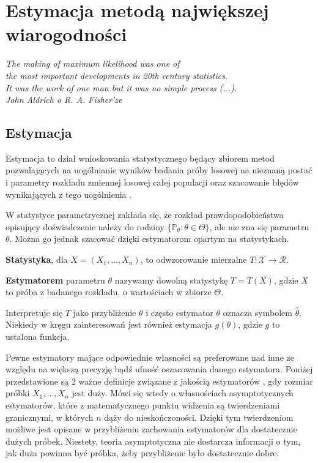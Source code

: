 \chapter{Estymacja metodą największej wiarogodności}\label{chap1}
\begin{flushright}
\textit{The making of maximum likelihood was one of \\
the most important developments in 20th century statistics. \\
It was the work of one man but it was no simple process (...). \\
John Aldrich o R. A. Fisher'ze
}
\end{flushright}

\section{Estymacja}

Estymacja to dział wnioskowania statystycznego będący zbiorem metod pozwalających na uogólnianie wyników badania próby losowej na nieznaną postać i parametry rozkładu zmiennej losowej całej populacji oraz szacowanie błędów wynikających z tego uogólnienia \cite{wiki1}.

W statystyce parametrycznej zakłada się, że rozkład prawdopodobieństwa
opisujący doświadczenie należy do rodziny $\{\mathbb{P}_{\theta} : \theta \in \Theta\}$, ale nie zna się
parametru $\theta$. Można go jednak szacować dzięki estymatorom opartym na statystykach.

\begin{definition}
\textbf{Statystyka}, dla $X=(X_1,\dots,X_n)$, to odwzorowanie mierzalne $T: \mathcal{X} \rightarrow \mathcal{R}.$
\end{definition}

\begin{definition}
\textbf{Estymatorem} parametru $\theta$ nazywamy dowolną statystykę
$T = T(X)$, gdzie $X$ to próba z badanego rozkładu, o wartościach w zbiorze $\Theta$. 
\end{definition}

Interpretuje się $T$ jako przybliżenie $\theta$ i często estymator $\theta$ oznacza symbolem $\hat{\theta}$. Niekiedy w kręgu zainteresowań jest również estymacja $g(\theta)$, gdzie $g$ to ustalona funkcja.

Pewne estymatory mające odpowiednie własności są preferowane nad inne ze względu na większą precyzję bądź ufność oszacowania danego estymatora. Poniżej przedstawione są 2 ważne definicje związane z jakością estymatorów \cite{niemiro}, gdy rozmiar próbki $X_1, \dots , X_n$ jest duży. Mówi się wtedy o własnościach asymptotycznych estymatorów, które z matematycznego punktu widzenia są twierdzeniami
granicznymi, w których $n$ dąży do nieskończoności. Dzięki tym twierdzeniom możliwe jest opisane w przybliżeniu zachowania estymatorów dla dostatecznie dużych próbek. Niestety, teoria asymptotyczna nie dostarcza informacji o tym, jak duża powinna być próbka, żeby przybliżenie było dostatecznie dobre.

